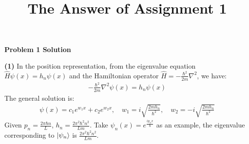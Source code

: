 \documentclass[12pt]{article}
\title{The Answer of Assignment 1}
\author{}
\date{}
\begin{document}
\maketitle

\begin{center}
    \textbf{Problem 1 Solution}
\end{center}

\textbf{(1)} In the position representation, from the eigenvalue equation $\hat{H}\psi(x) = h_n \psi(x)$ and the Hamiltonian operator $\hat{H} = -\frac{\hbar^2}{2m} \nabla^2$, we have:
\begin{align*}
    -\frac{\hbar^2}{2m} \nabla^2 \psi(x) = h_n \psi(x)
\end{align*}
The general solution is:
\begin{align*}
    \psi(x) = c_1 e^{w_1 x} + c_2 e^{w_2 x}, \quad w_1 = i\sqrt{\frac{2m h_n}{\hbar^2}}, \quad w_2 = -i\sqrt{\frac{2m h_n}{\hbar^2}}
\end{align*}
Given $p_n = \frac{2\pi\hbar n}{L}$, $h_n = \frac{2\pi^2 \hbar^2 n^2}{L m}$. Take $\psi_n(x) = e^{\frac{i p_n x}{\hbar}}$ as an example, the eigenvalue corresponding to $\ket{\psi_n}$ is $\frac{2\pi^2 \hbar^2 n^2}{L m}$.
\end{document}
